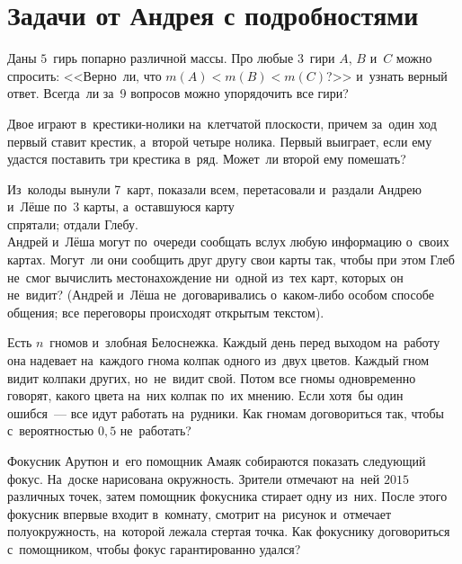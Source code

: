 
\section*{Задачи от Андрея с подробностями}


\begin{problems}

\item
Даны $5$~гирь попарно различной массы.
Про любые $3$~гири $A$, $B$ и~$C$ можно спросить:
<<Верно~ли, что $m(A) < m(B) < m(C)$?>> и~узнать верный ответ.
Всегда~ли за~9 вопросов можно упорядочить все гири?

\item
Двое играют в~крестики-нолики на~клетчатой плоскости, причем за~один ход первый
ставит крестик, а~второй четыре нолика.
Первый выиграет, если ему удастся поставить три крестика в~ряд.
Может~ли второй ему помешать?

\item
Из~колоды вынули 7~карт, показали всем, перетасовали и~раздали Андрею и~Лёше
по~3 карты, а~оставшуюся карту
\\
\subproblem спрятали;
\quad
\subproblem отдали Глебу.
\\
Андрей и~Лёша могут по~очереди сообщать вслух любую информацию о~своих картах.
Могут~ли они сообщить друг другу свои карты так, чтобы при этом Глеб не~смог
вычислить местонахождение ни~одной из~тех карт, которых он не~видит?
(Андрей и~Лёша не~договаривались о~каком-либо особом способе общения;
все переговоры происходят открытым текстом).

\item
Есть $n$~гномов и~злобная Белоснежка.
Каждый день перед выходом на~работу она надевает на~каждого гнома колпак одного
из~двух цветов.
Каждый гном видит колпаки других, но~не~видит свой.
Потом все гномы одновременно говорят, какого цвета на~них колпак по~их мнению.
Если хотя~бы один ошибся~--- все идут работать на~рудники.
Как гномам договориться так, чтобы с~вероятностью $0{,}5$ не~работать?

\item
Фокусник Арутюн и~его помощник Амаяк собираются показать следующий фокус.
На~доске нарисована окружность.
Зрители отмечают на~ней $2015$ различных точек, затем помощник фокусника
стирает одну из~них.
После этого фокусник впервые входит в~комнату, смотрит на~рисунок и~отмечает
полуокружность, на~которой лежала стертая точка.
Как фокуснику договориться с~помощником, чтобы фокус гарантированно удался?


\end{problems}
